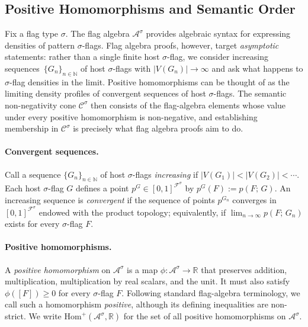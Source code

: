 \documentclass{article}
\newcommand{\poshom}[1]{\mathrm{Hom}^+(\mathcal{A}^{#1}, \mathbb{R})}
\newcommand{\den}[2]{p(#1;\,#2)}
\begin{document}
\subsection{Positive Homomorphisms and Semantic Order}
\label{sec:background-semantic-order}

Fix a flag type $\sigma$.  
The flag algebra $\mathcal{A}^\sigma$ provides algebraic syntax for expressing
densities of pattern $\sigma$-flags.  Flag algebra proofs, however, target
\emph{asymptotic} statements: rather than a single finite host $\sigma$-flag, we
consider increasing sequences~$\{G_n\}_{n\in\mathbb{N}}$ of host
$\sigma$-flags with $|V(G_n)|\to\infty$ and ask what happens to $\sigma$-flag
densities in the limit.  Positive homomorphisms can be thought of as the
limiting density profiles of convergent sequences of host $\sigma$-flags.
The semantic non-negativity cone
$\mathcal{C}^\sigma$ then consists of the flag-algebra elements
whose value under every positive homomorphism is non-negative, and establishing
membership in $\mathcal{C}^\sigma$ is precisely what flag algebra proofs aim
to do.

\paragraph{Convergent sequences.}
Call a sequence $\{G_n\}_{n\in\mathbb{N}}$ of host $\sigma$-flags \emph{increasing} if
$|V(G_1)| < |V(G_2)| < \cdots$.  Each host $\sigma$-flag $G$ defines a point
$p^G \in [0,1]^{\mathcal{F}^\sigma}$ by $p^G(F) := \den{F}{G}$.
An increasing sequence is \emph{convergent} if the sequence of points $p^{G_n}$
converges in $[0,1]^{\mathcal{F}^\sigma}$ endowed with the product topology;
equivalently, if $\lim_{n\to\infty}\den{F}{G_n}$ exists for every $\sigma$-flag $F$.

\paragraph{Positive homomorphisms.}
A \emph{positive homomorphism} on
$\mathcal{A}^\sigma$ is a map
$\phi:\mathcal{A}^\sigma \to \mathbb{R}$ that preserves addition,
multiplication, multiplication by real scalars, and the unit.  It must also
satisfy $\phi([F]) \geq 0$ for every $\sigma$-flag $F$.
Following standard flag-algebra terminology, we call such a homomorphism
\emph{positive}, although its defining inequalities are non-strict.
We write $\poshom{\sigma}$ for the set of all positive homomorphisms on
$\mathcal{A}^\sigma$.
\end{document}
